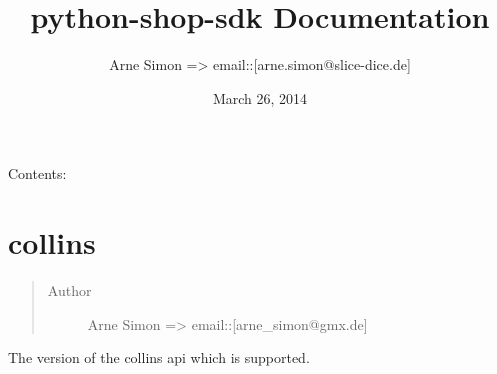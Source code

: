 \documentclass[letterpaper,10pt,english]{sphinxmanual}
\title{python-shop-sdk Documentation}
\date{March 26, 2014}
\author{Arne Simon =\textgreater{} email::{[}arne.simon@slice-dice.de{]}}
\begin{document}
\maketitle
\tableofcontents
{}\label{index::doc}


Contents:


\chapter{collins}
\label{collins:collins}\label{collins:welcome-to-python-shop-sdk-s-documentation}\label{collins::doc}\label{collins:module-collins}\begin{quote}\begin{description}
\item[{Author}] \leavevmode
Arne Simon =\textgreater{} email::{[}arne\_simon@gmx.de{]}

\end{description}\end{quote}

\begin{fulllineitems}
\label{collins:collins.COLLINS_VERSION}
The version of the collins api which is supported.

\end{fulllineitems}

\end{document}
